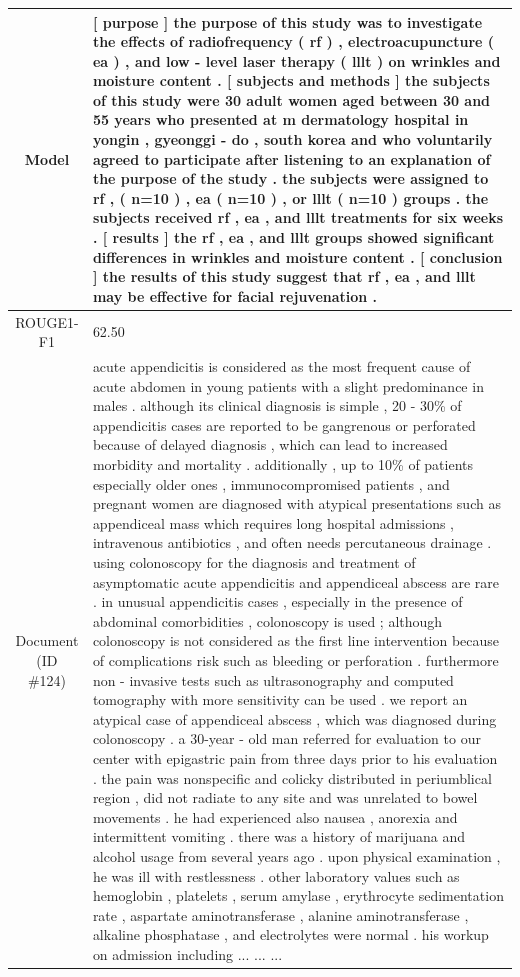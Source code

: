 \begin{table}[bth!]
\begin{tabular}{c|p{}}
\\ \hline
Model & 
[ purpose ] the purpose of this study was to investigate the effects of radiofrequency ( rf ) , electroacupuncture ( ea ) , and low - level laser therapy ( lllt ) on wrinkles and moisture content . [ subjects and methods ] the subjects of this study were 30 adult women aged between 30 and 55 years who presented at m dermatology hospital in yongin , gyeonggi - do , south korea and who voluntarily agreed to participate after listening to an explanation of the purpose of the study . the subjects were assigned to rf , ( n=10 ) , ea ( n=10 ) , or lllt ( n=10 ) groups . the subjects received rf , ea , and lllt treatments for six weeks . [ results ] the rf , ea , and lllt groups showed significant differences in wrinkles and moisture content . [ conclusion ] the results of this study suggest that rf , ea , and lllt may be effective for facial rejuvenation .
\\ \hline
ROUGE1-F1 & 
62.50
\\ \hline
\makecell{Document\\(ID \#124)} & 
acute appendicitis is considered as the most frequent cause of acute abdomen in young patients with a slight predominance in males . although its clinical diagnosis is simple , 20 - 30\% of appendicitis cases are reported to be gangrenous or perforated because of delayed diagnosis , which can lead to increased morbidity and mortality . additionally , up to 10\% of patients especially older ones , immunocompromised patients , and pregnant women are diagnosed with atypical presentations such as appendiceal mass which requires long hospital admissions , intravenous antibiotics , and often needs percutaneous drainage . using colonoscopy for the diagnosis and treatment of asymptomatic acute appendicitis and appendiceal abscess are rare . in unusual appendicitis cases , especially in the presence of abdominal comorbidities , colonoscopy is used ; although colonoscopy is not considered as the first line intervention because of complications risk such as bleeding or perforation . furthermore non - invasive tests such as ultrasonography and computed tomography with more sensitivity can be used . we report an atypical case of appendiceal abscess , which was diagnosed during colonoscopy . a 30-year - old man referred for evaluation to our center with epigastric pain from three days prior to his evaluation . the pain was nonspecific and colicky distributed in periumblical region , did not radiate to any site and was unrelated to bowel movements . he had experienced also nausea , anorexia and intermittent vomiting . there was a history of marijuana and alcohol usage from several years ago . upon physical examination , he was ill with restlessness . other laboratory values such as hemoglobin , platelets , serum amylase , erythrocyte sedimentation rate , aspartate aminotransferase , alanine aminotransferase , alkaline phosphatase , and electrolytes were normal . his workup on admission including ... ... ... 

\end{tabular}
\end{table}
